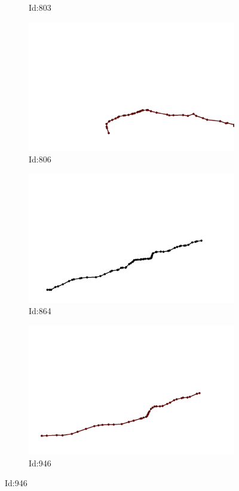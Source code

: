 \documentclass[12pt,twoside]{report}
\begin{document}
\begin{figure}
\begin{subfigure}[b]{0.20\textwidth}
\caption{Id:803}
\end{subfigure}
\begin{subfigure}[b]{0.20\textwidth}
\centering
\includegraphics[width=\textwidth]{../../trajectories/806.png}
\caption{Id:806}
\end{subfigure}
\begin{subfigure}[b]{0.20\textwidth}
\centering
\includegraphics[width=\textwidth]{../../trajectories/864.png}
\caption{Id:864}
\end{subfigure}
\begin{subfigure}[b]{0.20\textwidth}
\centering
\includegraphics[width=\textwidth]{../../trajectories/946.png}
\caption{Id:946}
\end{subfigure}
\end{figure}
\end{document}
